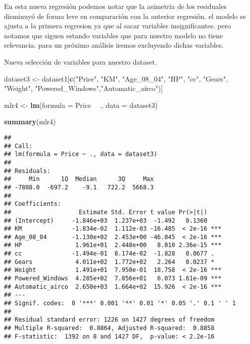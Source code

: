 \documentclass[
]{article}
\newenvironment{Shaded}{\begin{snugshade}}{\end{snugshade}}
\newcommand{\DataTypeTok}[1]{\textcolor[rgb]{0.13,0.29,0.53}{#1}}
\newcommand{\KeywordTok}[1]{\textcolor[rgb]{0.13,0.29,0.53}{\textbf{#1}}}
\newcommand{\NormalTok}[1]{#1}
\newcommand{\OperatorTok}[1]{\textcolor[rgb]{0.81,0.36,0.00}{\textbf{#1}}}
\newcommand{\StringTok}[1]{\textcolor[rgb]{0.31,0.60,0.02}{#1}}
\begin{document}
En esta nueva regresión podemos notar que la asimetría de los residuales
disminuyó de forma leve en comparación con la anterior regresión. el
modelo se ajusta a la primera regresion ya que al sacar variables
insignificantes. pero notamos que siguen estando variables que para
nuestro modelo no tiene relevancia. para un próximo análisis iremos
excluyendo dichas variables.

Nueva selección de variables para nuestro dataset.

\begin{Shaded}
\begin{Highlighting}[]
\NormalTok{dataset3 <-}\StringTok{ }\NormalTok{dataset1[}\KeywordTok{c}\NormalTok{(}\StringTok{"Price"}\NormalTok{, }\StringTok{"KM"}\NormalTok{, }\StringTok{"Age_08_04"}\NormalTok{, }\StringTok{"HP"}\NormalTok{, }\StringTok{"cc"}\NormalTok{, }\StringTok{"Gears"}\NormalTok{, }\StringTok{"Weight"}\NormalTok{,}
                       \StringTok{"Powered_Windows"}\NormalTok{,}\StringTok{"Automatic_airco"}\NormalTok{)]}
\end{Highlighting}
\end{Shaded}

\begin{Shaded}
\begin{Highlighting}[]
\NormalTok{mlr4 <-}\StringTok{ }\KeywordTok{lm}\NormalTok{(}\DataTypeTok{formula =}\NormalTok{ Price }\OperatorTok{~}\StringTok{ }\NormalTok{., }\DataTypeTok{data =}\NormalTok{  dataset3)}

\KeywordTok{summary}\NormalTok{(mlr4)}
\end{Highlighting}
\end{Shaded}

\begin{verbatim}
## 
## Call:
## lm(formula = Price ~ ., data = dataset3)
## 
## Residuals:
##     Min      1Q  Median      3Q     Max 
## -7808.0  -697.2    -9.1   722.2  5668.3 
## 
## Coefficients:
##                   Estimate Std. Error t value Pr(>|t|)    
## (Intercept)     -1.846e+03  1.237e+03  -1.492   0.1360    
## KM              -1.834e-02  1.112e-03 -16.485  < 2e-16 ***
## Age_08_04       -1.130e+02  2.453e+00 -46.045  < 2e-16 ***
## HP               1.961e+01  2.448e+00   8.010 2.36e-15 ***
## cc              -1.494e-01  8.174e-02  -1.828   0.0677 .  
## Gears            4.011e+02  1.772e+02   2.264   0.0237 *  
## Weight           1.491e+01  7.950e-01  18.758  < 2e-16 ***
## Powered_Windows  4.285e+02  7.056e+01   6.073 1.61e-09 ***
## Automatic_airco  2.650e+03  1.664e+02  15.926  < 2e-16 ***
## ---
## Signif. codes:  0 '***' 0.001 '**' 0.01 '*' 0.05 '.' 0.1 ' ' 1
## 
## Residual standard error: 1226 on 1427 degrees of freedom
## Multiple R-squared:  0.8864, Adjusted R-squared:  0.8858 
## F-statistic:  1392 on 8 and 1427 DF,  p-value: < 2.2e-16
\end{verbatim}
\end{document}
